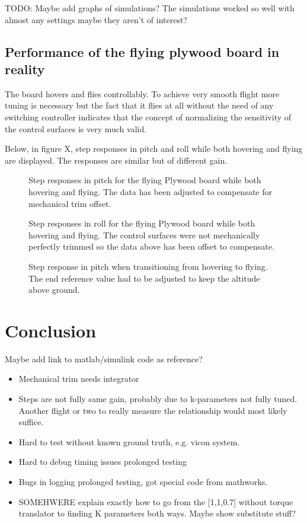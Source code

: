 \documentclass{article}
\begin{document}
TODO: Maybe add graphs of simulations?
The simulations worked so well with almost any settings maybe they aren't of interest?

\subsection{Performance of the flying plywood board in reality}
The board hovers and flies controllably.
To achieve very smooth flight more tuning is necessary but the fact that it flies at all without the need of any switching controller indicates that the concept of normalizing the sensitivity of the control surfaces is very much valid.

Below, in figure X, step responses in pitch and roll while both hovering and flying are displayed.
The responses are similar but of different gain.


\begin{figure}[]
    \centering
    
    \caption{Step responses in pitch for the flying Plywood board while both hovering and flying. The data has been adjusted to compensate for mechanical trim offset.}
    \label{airplane}
\end{figure}

\begin{figure}[]
    
    \caption{Step responses in roll for the flying Plywood board while both hovering and flying. The control surfaces were not mechanically perfectly trimmed so the data above has been offset to compensate.}
    \label{airplane}
\end{figure}

\begin{figure}[]
    
    \caption{Step response in pitch when transitioning from hovering to flying. The end reference value had to be adjusted to keep the altitude above ground.}
    \label{airplane}
\end{figure}



\section{Conclusion}

Maybe add link to matlab/simulink code as reference?

\begin{itemize}
\item Mechanical trim needs integrator
\item Steps are not fully same gain, probably due to k-parameters not fully tuned. Another flight or two to really measure the relationship would most likely suffice.
\item Hard to test without known ground truth, e.g. vicon system.
\item Hard to debug timing issues prolonged testing
\item Bugs in logging prolonged testing, got special code from mathworks.
\item SOMEHWERE explain exactly how to go from the [1,1,0.7] without torque translator to finding K parameters both ways. Maybe show substitute stuff?

\end{itemize}
\end{document}
